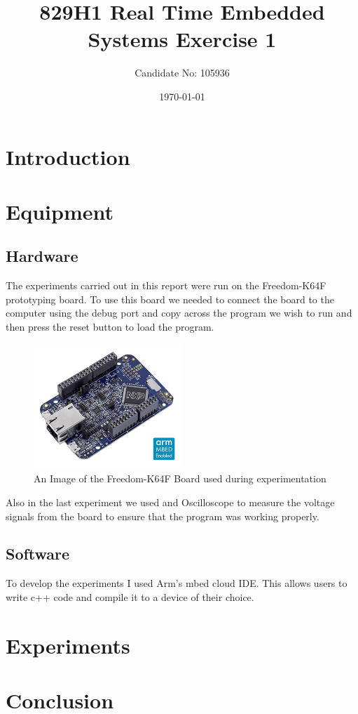 \documentclass[a4paper,12pt]{scrartcl}
\title{829H1 Real Time Embedded Systems Exercise 1}
\author{Candidate No: 105936}
\date{\today}
\begin{document}
	
	\begin{titlepage}
		\maketitle
	\end{titlepage}
	
	\tableofcontents
	\newpage
	
	\section{Introduction}
	{
		
	}

	\section{Equipment}
	{
		\subsection{Hardware}{
			The experiments carried out in this report were run on the Freedom-K64F prototyping board\cite{nxpproducts2014}. To use this board we needed to connect the board to the computer using the debug port and copy across the program we wish to run and then press the reset button to load the program.
			\begin{figure}[h]
				\centering
				\includegraphics[width=0.5\textwidth]{FRDM-K64F-ANGLE}
				\caption{An Image of the Freedom-K64F Board used during experimentation\cite{nxpproducts2014}}
				\label{img:FRDM-K64F}
			\end{figure}
			Also in the last experiment we used and Oscilloscope to measure the voltage signals from the board to ensure that the program was working properly.
		}
		\subsection{Software}
		{
			To develop the experiments I used Arm's mbed cloud IDE. This allows users to write c++ code and compile it to a device of their choice. 
		}
	}
	
	\section{Experiments}
	{
		
	}

	\section{Conclusion}
	{
	
	}
	
	\newpage
	
	\printbibliography[heading=bibintoc,title=References]
\end{document}
